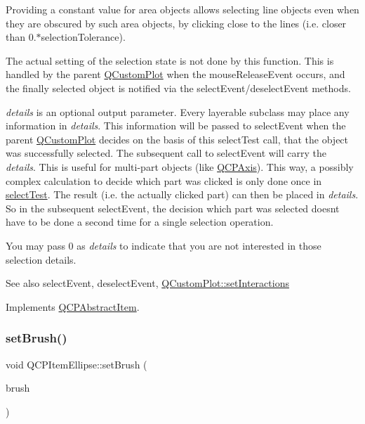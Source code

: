 Providing a constant value for area objects allows selecting line objects even when they are obscured by such area objects, by clicking close to the lines (i.\+e. closer than 0.$\ast$selection\+Tolerance).

The actual setting of the selection state is not done by this function. This is handled by the parent \hyperlink{class_q_custom_plot}{Q\+Custom\+Plot} when the mouse\+Release\+Event occurs, and the finally selected object is notified via the select\+Event/deselect\+Event methods.

{\itshape details} is an optional output parameter. Every layerable subclass may place any information in {\itshape details}. This information will be passed to select\+Event when the parent \hyperlink{class_q_custom_plot}{Q\+Custom\+Plot} decides on the basis of this select\+Test call, that the object was successfully selected. The subsequent call to select\+Event will carry the {\itshape details}. This is useful for multi-\/part objects (like \hyperlink{class_q_c_p_axis}{Q\+C\+P\+Axis}). This way, a possibly complex calculation to decide which part was clicked is only done once in \hyperlink{class_q_c_p_item_ellipse_aa41be2180b2ace2e303b88d005c14243}{select\+Test}. The result (i.\+e. the actually clicked part) can then be placed in {\itshape details}. So in the subsequent select\+Event, the decision which part was selected doesn\textquotesingle{}t have to be done a second time for a single selection operation.

You may pass 0 as {\itshape details} to indicate that you are not interested in those selection details.

\begin{DoxySeeAlso}{See also}
select\+Event, deselect\+Event, \hyperlink{class_q_custom_plot_a5ee1e2f6ae27419deca53e75907c27e5}{Q\+Custom\+Plot\+::set\+Interactions} 
\end{DoxySeeAlso}


Implements \hyperlink{class_q_c_p_abstract_item_a96d522d10ffc0413b9a366c6f7f0476b}{Q\+C\+P\+Abstract\+Item}.

\hypertarget{class_q_c_p_item_ellipse_a49fc74e6965834e873d027d026def798}{}\label{class_q_c_p_item_ellipse_a49fc74e6965834e873d027d026def798} 
\subsubsection{\texorpdfstring{set\+Brush()}{setBrush()}}
{\footnotesize\ttfamily void Q\+C\+P\+Item\+Ellipse\+::set\+Brush (\begin{DoxyParamCaption}\item[{const Q\+Brush \&}]{brush }\end{DoxyParamCaption})}

